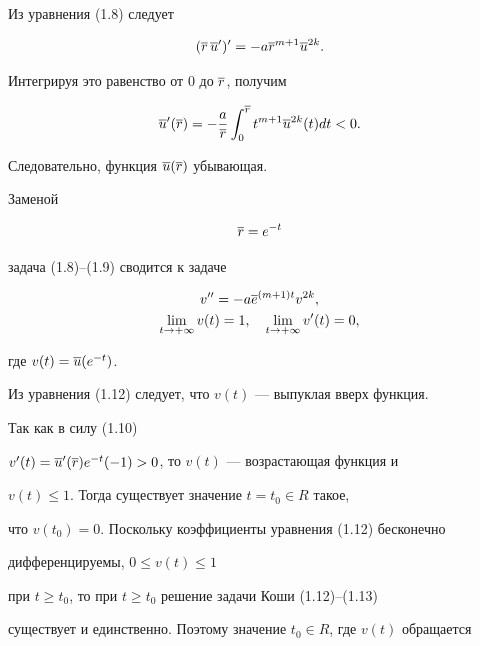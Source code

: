 \begin{pf} Из уравнения (1.8) следует 


$$ 


(\ovl r\,\ovl u')'=-a\ovl r^{m+1}\ovl u^{2k}. 


$$ 


Интегрируя это равенство от 0 до $\overline r$, получим 


\begin{equation} 


\ovl u'(\ovl r)=-\frac{a}{\ovl r}\int_0^{\ovl r}t^{m+1} 


\ovl u^{2k}(t)dt <0. 


\end{equation} 


Следовательно, функция $\overline u(\overline r)$ убывающая. 


 


Заменой 


\begin{equation} 


\ovl r=e^{-t} 


\end{equation} 


задача (1.8)--(1.9) сводится к задаче 


\begin{gather} 


v''=-a\ovl e^{(m+1)t}v^{2k}, \\ 


\lim_{t\to +\infty}v(t)=1,\quad \lim_{t\to +\infty}v'(t)=0, 


\end{gather} 


где $v(t)=\overline u(e^{-t})$. 


 


Из уравнения (1.12) следует, что $v(t)$ --- выпуклая вверх функция. 


Так как в силу (1.10) 


$v'(t)=\overline u'(\overline r)e^{-t}(-1)>0$, то $v(t)$ --- возрастающая функция и 


$v(t)\le 1$. Тогда существует значение $t=t_0\in R$ такое, 


что $v(t_0)=0$. Поскольку коэффициенты уравнения (1.12) бесконечно 


дифференцируемы, $0\le v(t)\le 1$ 


при $t\ge t_0$, то при $t\ge t_0$ решение задачи Коши (1.12)--(1.13) 


существует и единственно. Поэтому значение $t_0\in R$, где $v(t)$ обращается 



\end{pf}
